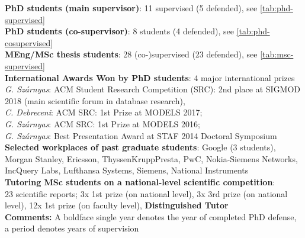 \documentclass{xetexCV}
\begin{document}

\textbf{PhD students (main supervisor)}: 11 supervised (5 defended), see \autoref{tab:phd-supervised} \\
\textbf{PhD students (co-supervisor)}: 8 students (4 defended), see \autoref{tab:phd-cosupervised} \\
\textbf{MEng/MSc thesis students}: 28 (co-)supervised (23 defended), see \autoref{tab:msc-supervised} \\

\textbf{International Awards Won by PhD students}: 4 major international prizes \\
\emph{G. Sz\'arnyas}: ACM Student Research Competition (SRC): 2nd place at SIGMOD 2018 (main scientific forum in database research), \\
\emph{C. Debreceni}: ACM SRC: 1st Prize at MODELS 2017;\\
\emph{G. Sz\'arnyas}: ACM SRC: 1st Prize at MODELS 2016; \\
\emph{G. Sz\'arnyas}: Best Presentation Award at STAF 2014 Doctoral Symposium \\


\textbf{Selected workplaces of past graduate students}: Google (3 students), Morgan Stanley, Ericsson, ThyssenKruppPresta, PwC, Nokia-Siemens Networks, 
IncQuery Labs, Lufthansa Systems, Siemens, National Instruments \\


\textbf{Tutoring MSc students on a national-level scientific competition}: \\
23 scientific reports; 3x 1st prize (on national level), 3x 3rd prize (on national
level), 12x 1st prize (on faculty level), %
\textbf{Distinguished Tutor}  \\%

\textbf{Comments:} A boldface single year denotes the year of completed PhD defense, a period denotes years of supervision \\
\end{document}
